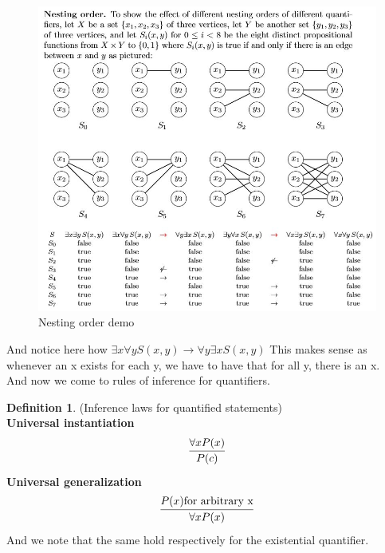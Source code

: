 \documentclass[titlepage]{article}
\theoremstyle{definition}
\newtheorem{definition}{Definition}
\numberwithin{equation}{subsection}
\numberwithin{remark}{subsection}
\begin{document}
\begin{figure}[H]
    \centering
    \includegraphics[scale = 0.8]{epflLectureNotes/advancedComputation/figures/nesting.JPG}
    \caption{Nesting order demo}
    \label{fig:my_label}
\end{figure}

And notice here how $\exists x \forall y S(x,y) \rightarrow \forall y \exists x S(x,y)$ This makes sense as whenever an x exists for each y, we have to have that for all y, there is an x. 
\\
\clearpage
And now we come to rules of inference for quantifiers. 

\begin{definition}(Inference laws for quantified statements)
\\
\textbf{Universal instantiation} 
\begin{equation*}
    \infer{P(c)}{\forall x P(x)}
\end{equation*}
\textbf{Universal generalization}
\begin{equation*}
        \infer{\forall x P(x)}{P(x) \text{for arbitrary x}}
\end{equation*}
And we note that the same hold respectively for the existential quantifier. 
\end{definition}
\end{document}
